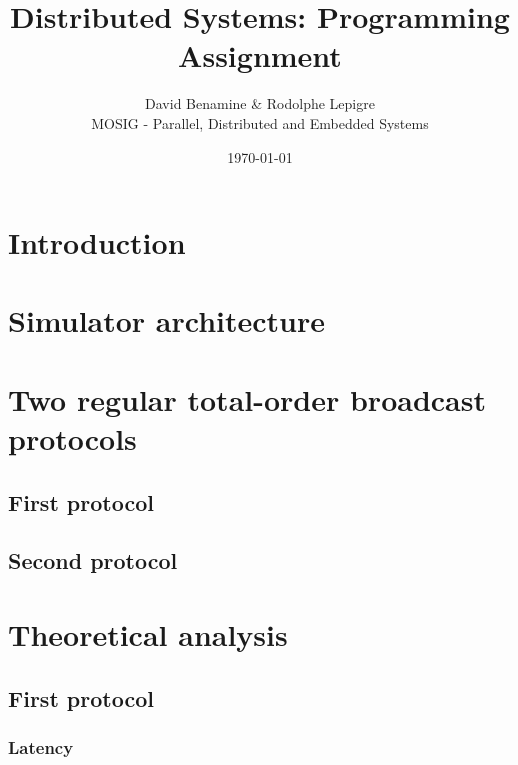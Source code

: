 \documentclass[a4paper]{article}
\begin{document}
\title{Distributed Systems: Programming Assignment}
\author{David Benamine \& Rodolphe Lepigre\\
        MOSIG - Parallel, Distributed and Embedded Systems}
\date{\today}
\maketitle

\section*{Introduction}

\section*{Simulator architecture}

\section*{Two regular total-order broadcast protocols}

\subsection*{First protocol}

\subsection*{Second protocol}

\section*{Theoretical analysis}

\subsection*{First protocol}

\subsubsection*{Latency}
\end{document}
